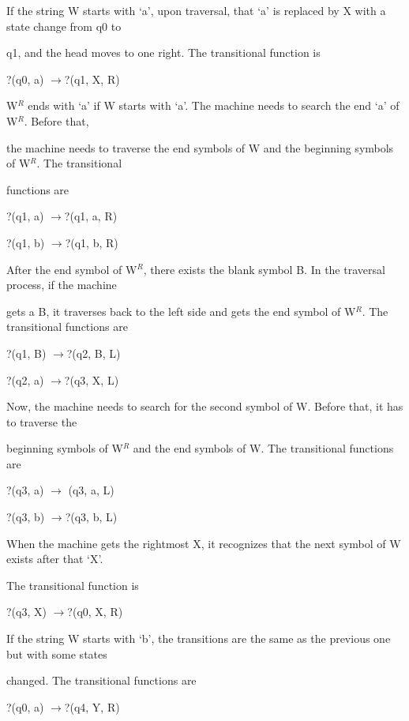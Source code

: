 \documentclass{article} %
\begin{document}
If the string W starts with `a', upon traversal, that `a' is replaced by X with a state change from q0 to

\noindent q1, and the head moves to one right. The transitional function is

\noindent ?(q0, a) $\to $?(q1, X, R)

\noindent W${}^{R}$ ends with `a' if W starts with `a'. The machine needs to search the end `a' of W${}^{R}$. Before that,

\noindent the machine needs to traverse the end symbols of W and the beginning symbols of W${}^{R}$. The transitional

\noindent functions are

\noindent ?(q1, a) $\to $?(q1, a, R)

\noindent ?(q1, b) $\to $?(q1, b, R)

\noindent After the end symbol of W${}^{R}$, there exists the blank symbol B. In the traversal process, if the machine

\noindent gets a B, it traverses back to the left side and gets the end symbol of W${}^{R}$. The transitional functions are

\noindent ?(q1, B) $\to $?(q2, B, L)

\noindent ?(q2, a) $\to $?(q3, X, L)

\noindent Now, the machine needs to search for the second symbol of W. Before that, it has to traverse the

\noindent beginning symbols of W${}^{R}$ and the end symbols of W. The transitional functions are

\noindent ?(q3, a) $\to $ (q3, a, L)

\noindent ?(q3, b) $\to $?(q3, b, L)

\noindent When the machine gets the rightmost X, it recognizes that the next symbol of W exists after that `X'.

\noindent The transitional function is

\noindent ?(q3, X) $\to $?(q0, X, R)

\noindent 

\noindent 

\noindent 

\noindent 

\noindent If the string W starts with `b', the transitions are the same as the previous one but with some states

\noindent changed. The transitional functions are

\noindent ?(q0, a) $\to $?(q4, Y, R)
\end{document}
